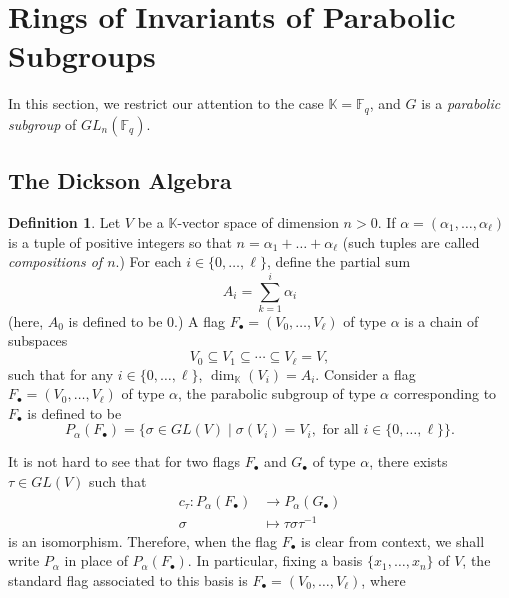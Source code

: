 \documentclass[12pt,a4paper]{report}
\theoremstyle{definition}
\newtheorem{definition}[theorem]{Definition}
\theoremstyle{remark}
\theoremstyle{definition}
\begin{document}
\section{Rings of Invariants of Parabolic Subgroups}
In this section, we restrict our attention to the case $\mathbb{K} = \mathbb{F}_q$, and $G$ is a \emph{parabolic subgroup} of $GL_n(\mathbb{F}_q)$. 
\subsection{The Dickson Algebra}
\begin{definition}\label{def:flag}
    Let $V$ be a $\mathbb{K}$-vector space of dimension $n>0$. If $\alpha = (\alpha_1, \ldots, \alpha_{\ell})$ is a tuple of positive integers so that $n = \alpha_1 + \ldots + \alpha_{\ell}$ (such tuples are called \emph{compositions of $n$}.) For each $i\in \{0, \ldots, \ell\}$, define the partial sum 
    \begin{equation*}
        A_i = \sum\limits_{k=1}^{i}\alpha_i
    \end{equation*}
    (here, $A_0$ is defined to be $0$.) A flag $F_{\bullet} = (V_0, \ldots, V_{\ell})$ of type $\alpha$ is a chain of subspaces 
    \begin{equation*}
        V_0 \subseteq V_1 \subseteq \cdots \subseteq V_{\ell} = V,
    \end{equation*}
    such that for any $i\in \{0, \ldots, \ell\}$, $\dim_{\mathbb{K}}(V_i) = A_i$. Consider a flag $F_{\bullet} = (V_0, \ldots, V_{\ell})$ of type $\alpha$, the parabolic subgroup of type $\alpha$ corresponding to $F_{\bullet}$ is defined to be
    \begin{equation*}
        P_{\alpha}(F_{\bullet}) = \{\sigma\in GL(V)\mid \sigma(V_i) = V_i, \text{ for all } i\in \{0, \ldots, \ell\}\}. 
    \end{equation*}
\end{definition}
It is not hard to see that for two flags $F_{\bullet}$ and $G_{\bullet}$ of type $\alpha$, there exists $\tau\in GL(V)$ such that
\begin{align*}
    c_{\tau}: P_{\alpha}(F_{\bullet}) &\to P_{\alpha}(G_{\bullet})\\ 
\sigma &\mapsto \tau \sigma \tau^{-1}
\end{align*}
is an isomorphism. Therefore, when the flag $F_{\bullet}$ is clear from context, we shall write $P_{\alpha}$ in place of $P_{\alpha}(F_{\bullet})$. In particular, fixing a basis $\{x_1, \ldots, x_n\}$ of $V$, the standard flag associated to this basis is $F_{\bullet} = (V_0, \ldots, V_{\ell})$, where
\end{document}
